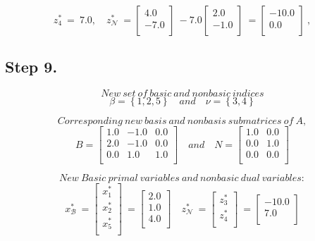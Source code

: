 \documentclass [12pt] {article}
\begin{document}
\[
z_{4}^{*}\ =\ 7.0, \quad z_{\mathcal N}^{*}\ =\begin{bmatrix}
4.0 \\ -7.0 \\ 
\end{bmatrix}\ -7.0\begin{bmatrix}
2.0 \\ -1.0 \\ 
\end{bmatrix}\ =\begin{bmatrix}
-10.0 \\ 0.0 \\ 
\end{bmatrix}\ ,
\]
\subsection{Step 9.}

\[ New\ set\  of\  basic\  and\  nonbasic\  indices \]
\[
\beta= \left\{1, 2, 5\right\} \quad and \quad  \nu=\left\{3, 4\right\}
\]

\[
Corresponding\ new\ basis\ and\ nonbasis\ submatrices\ of\ A,
\]
\[
B =
\begin{bmatrix}
1.0 & -1.0 & 0.0 \\ 2.0 & -1.0 & 0.0 \\ 0.0 & 1.0 & 1.0 \\ 
\end{bmatrix} \quad and \quad
\mathit{N} =
\begin{bmatrix}
1.0 & 0.0 \\ 0.0 & 1.0 \\ 0.0 & 0.0 \\ 
\end{bmatrix}
\]

\[
New\ Basic\ primal\ variables\ and\ nonbasic\ dual\ variables:
\]
\[
x_{\mathcal B}^{*}\ =\begin{bmatrix}
x_{1}^{*} \\x_{2}^{*} \\x_{5}^{*} \\
\end{bmatrix}\ =\begin{bmatrix}
2.0 \\ 1.0 \\ 4.0 \\ 
\end{bmatrix}\quad
z_{\mathcal N}^{*}\ =\begin{bmatrix}
z_{3}^{*} \\z_{4}^{*} \\
\end{bmatrix}\ =\begin{bmatrix}
-10.0 \\ 7.0 \\ 
\end{bmatrix}
\]
\end{document}
